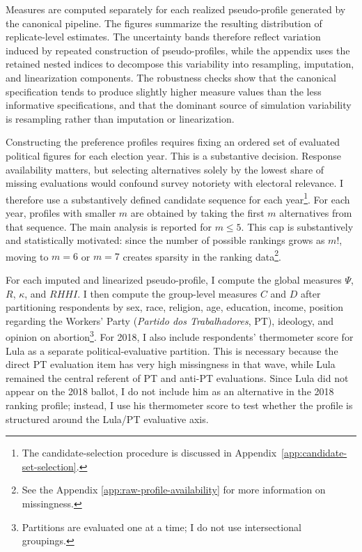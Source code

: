 \documentclass[12pt]{article}
\begin{document}
Measures are computed separately for each realized pseudo-profile generated by
the canonical pipeline. The figures summarize the resulting distribution of
replicate-level estimates. The uncertainty bands therefore reflect variation
induced by repeated construction of pseudo-profiles, while the appendix uses
the retained nested indices to decompose this variability into resampling,
imputation, and linearization components. The robustness checks show that the
canonical specification tends to produce slightly higher measure values than
the less informative specifications, and that the dominant source of simulation
variability is resampling rather than imputation or linearization.

Constructing the preference profiles requires fixing an ordered set of evaluated
political figures for each election year. This is a substantive decision.
Response availability matters, but selecting alternatives solely by the lowest
share of missing evaluations would confound survey notoriety with electoral
relevance. I therefore use a substantively defined candidate sequence for each
year\footnote{The candidate-selection procedure is discussed in Appendix~\ref{app:candidate-set-selection}.}. For each year, profiles with smaller \(m\) are obtained by taking the
first \(m\) alternatives from that sequence. The main analysis is reported for
\(m \leq 5\). This cap is substantively and statistically motivated: since the
number of possible rankings grows as \(m!\), moving to \(m=6\) or \(m=7\)
creates sparsity in the ranking data\footnote{See the Appendix
  \ref{app:raw-profile-availability} for more information on missingness.}.

For each imputed and linearized pseudo-profile, I compute the global measures
\(\Psi\), \(R\), \(\kappa\), and \(RHHI\). I then compute the group-level measures
\(C\) and \(D\) after partitioning respondents by sex, race, religion, age,
education, income, position regarding the Workers' Party (\textit{Partido dos
Trabalhadores}, PT), ideology, and opinion on abortion\footnote{Partitions
are evaluated one at a time; I do not use intersectional groupings.}. For 2018,
I also include respondents' thermometer score for Lula as a separate
political-evaluative partition. This is necessary because the direct PT
evaluation item has very high missingness in that wave, while Lula remained the
central referent of PT and anti-PT evaluations. Since Lula did not appear on the
2018 ballot, I do not include him as an alternative in the 2018 ranking profile;
instead, I use his thermometer score to test whether the profile is structured
around the Lula/PT evaluative axis.
\end{document}
